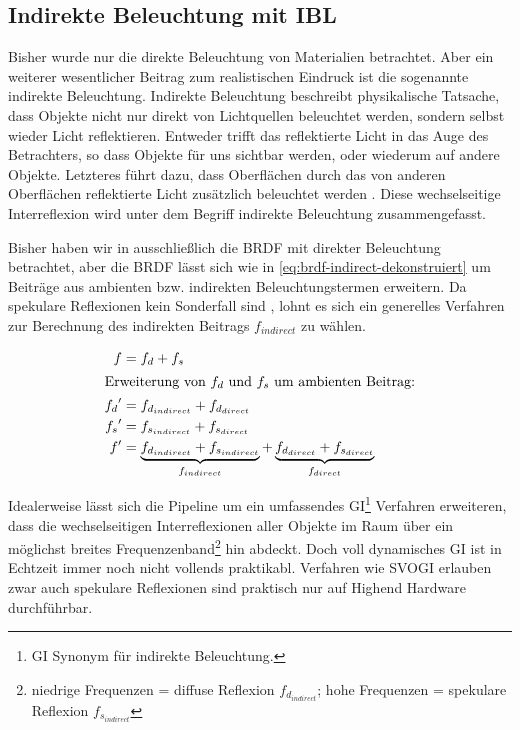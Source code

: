 \subsection[Indirekte Beleuchtung]{Indirekte Beleuchtung mit \acl{IBL}}

Bisher wurde nur die direkte Beleuchtung von Materialien betrachtet. Aber ein weiterer wesentlicher Beitrag zum realistischen Eindruck ist die sogenannte indirekte Beleuchtung. Indirekte Beleuchtung beschreibt physikalische Tatsache, dass Objekte nicht nur direkt von Lichtquellen beleuchtet werden, sondern selbst wieder Licht reflektieren. Entweder trifft das reflektierte Licht in das Auge des Betrachters, so dass Objekte für uns sichtbar werden, oder wiederum auf andere Objekte. Letzteres führt dazu, dass Oberflächen durch das von anderen Oberflächen reflektierte Licht zusätzlich beleuchtet werden . Diese wechselseitige Interreflexion wird unter dem Begriff indirekte Beleuchtung zusammengefasst.

Bisher haben wir in  ausschließlich die \ac{BRDF} mit direkter Beleuchtung betrachtet, aber die \ac{BRDF} lässt sich wie in \ref{eq:brdf-indirect-dekonstruiert} um Beiträge aus ambienten bzw. indirekten Beleuchtungstermen erweitern. Da spekulare Reflexionen kein Sonderfall sind \parencite{Hable2010}, lohnt es sich ein generelles Verfahren zur Berechnung des indirekten Beitrags $f_{indirect}$ zu wählen. 

\begin{align}
	\label{eq:brdf-indirect}
	f   &= f_d + f_s\\
	\intertext{Erweiterung von $f_d$ und $f_s$ um ambienten Beitrag:}
	{f_d}^{\prime} &= f_{d_{indirect}} + f_{d_{direct}}\\
	{f_s}^{\prime} &= f_{s_{indirect}} + f_{s_{direct}}\\
	\label{eq:brdf-indirect-dekonstruiert}
	f^{\prime}   &= \underbrace{f_{d_{indirect}} + f_{s_{indirect}}}_{f_{indirect}} + \underbrace{f_{d_{direct}} + f_{s_{direct}}}_{f_{direct}}
\end{align}

Idealerweise lässt sich die Pipeline um ein umfassendes \acf{GI}\footnote{\acl{GI} Synonym für indirekte Beleuchtung.} Verfahren erweiteren, dass die wechselseitigen Interreflexionen aller Objekte im Raum über ein möglichst breites Frequenzenband\footnote{niedrige Frequenzen = diffuse Reflexion $f_{d_{indirect}}$; hohe Frequenzen = spekulare Reflexion $f_{s_{indirect}}$} hin abdeckt. Doch voll dynamisches \ac{GI} ist in Echtzeit immer noch nicht vollends praktikabl. Verfahren wie \ac{SVOGI} \parencite{Lin2013} erlauben zwar auch spekulare Reflexionen sind praktisch nur auf Highend Hardware durchführbar.

